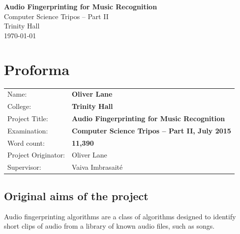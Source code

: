 \documentclass[12pt,a4paper,twoside,openright]{report}
\begin{document}





\begin{titlepage}


\vspace*{60mm}
\begin{center}
\Huge
\textbf{Audio Fingerprinting for Music Recognition} \\[5mm]
Computer Science Tripos -- Part II \\[5mm]
Trinity Hall \\[5mm]
\today  %
\end{center}


\end{titlepage}



\pagestyle{plain}

\chapter*{Proforma}

{\large
\begin{tabular}{ll}
Name:               & \bf Oliver Lane                       \\
College:            & \bf Trinity Hall                     \\
Project Title:      & \bf Audio Fingerprinting for Music Recognition \\
Examination:        & \bf Computer Science Tripos -- Part II, July 2015  \\
Word count:         & \bf 11,390  \\
Project Originator: & Oliver Lane                    \\
Supervisor:         & Vaiva Imbrasait\'{e}                    \\ 
\end{tabular}
}

\section*{Original aims of the project}

Audio fingerprinting algorithms are a class of algorithms designed to identify short clips of audio from a library of known audio files, such as songs.
\end{document}
